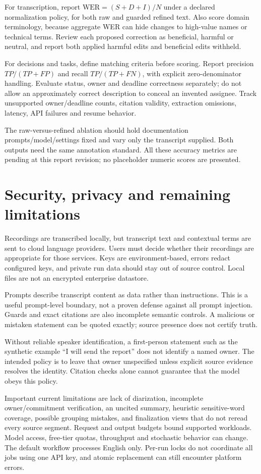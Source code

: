\documentclass[11pt,a4paper]{article}
\begin{document}
For transcription, report $\mathrm{WER}=(S+D+I)/N$ under a declared normalization policy, for both raw and guarded refined text. Also score domain terminology, because aggregate WER can hide changes to high-value names or technical terms. Review each proposed correction as beneficial, harmful or neutral, and report both applied harmful edits and beneficial edits withheld.

For decisions and tasks, define matching criteria before scoring. Report precision $TP/(TP+FP)$ and recall $TP/(TP+FN)$, with explicit zero-denominator handling. Evaluate status, owner and deadline correctness separately; do not allow an approximately correct description to conceal an invented assignee. Track unsupported owner/deadline counts, citation validity, extraction omissions, latency, API failures and resume behavior.

The raw-versus-refined ablation should hold documentation prompts/model/settings fixed and vary only the transcript supplied. Both outputs need the same annotation standard. All these accuracy metrics are pending at this report revision; no placeholder numeric scores are presented.

\section{Security, privacy and remaining limitations}
Recordings are transcribed locally, but transcript text and contextual terms are sent to cloud language providers. Users must decide whether their recordings are appropriate for those services. Keys are environment-based, errors redact configured keys, and private run data should stay out of source control. Local files are not an encrypted enterprise datastore.

Prompts describe transcript content as data rather than instructions. This is a useful prompt-level boundary, not a proven defense against all prompt injection. Guards and exact citations are also incomplete semantic controls. A malicious or mistaken statement can be quoted exactly; source presence does not certify truth.

Without reliable speaker identification, a first-person statement such as the synthetic example ``I will send the report'' does not identify a named owner. The intended policy is to leave that owner unspecified unless explicit source evidence resolves the identity. Citation checks alone cannot guarantee that the model obeys this policy.

Important current limitations are lack of diarization, incomplete owner/commitment verification, an uncited summary, heuristic sensitive-word coverage, possible grouping mistakes, and finalization views that do not reread every source segment. Request and output budgets bound supported workloads. Model access, free-tier quotas, throughput and stochastic behavior can change. The default workflow processes English only. Per-run locks do not coordinate all jobs using one API key, and atomic replacement can still encounter platform errors.
\end{document}
